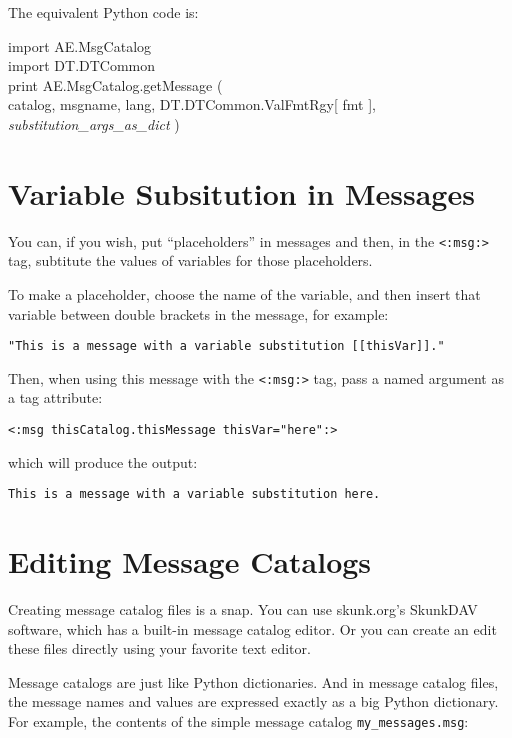 \documentclass{manual}
\begin{document}
The equivalent Python code is:
\begin{obeylines}\ttfamily
import AE.MsgCatalog
import DT.DTCommon
print AE.MsgCatalog.getMessage ( 
    catalog, msgname, lang, DT.DTCommon.ValFmtRgy[ fmt ], 
    \emph{substitution_args_as_dict} )
\end{obeylines}

\section{Variable Subsitution in Messages}
\label{msgcatvarsub}

You can, if you wish, put ``placeholders'' in
messages and then, in the 
\texttt{<:msg:>} 
tag, subtitute the values of variables for those
placeholders.

To make a placeholder, choose the name of the variable, 
and then insert that variable between double brackets in
the message, for example:

\begin{verbatim}
"This is a message with a variable substitution [[thisVar]]."
\end{verbatim}

Then, when using this message with the
\texttt{<:msg:>} 
tag, pass a named argument as a tag attribute:

\begin{verbatim}
<:msg thisCatalog.thisMessage thisVar="here":>
\end{verbatim}

which will produce the output:

\begin{verbatim}
This is a message with a variable substitution here.
\end{verbatim}


\section{Editing Message Catalogs}
\label{msgcatedit}

Creating message catalog files is a snap. You can
use skunk.org's SkunkDAV software, which has a built-in
message catalog editor. Or you can create an edit
these files directly using your favorite text editor.

Message catalogs are just like Python dictionaries.
And in message catalog files, the message names and
values are expressed exactly as a big Python dictionary.
For example, the contents of the simple message catalog
\texttt{my_messages.msg}:
\end{document}
